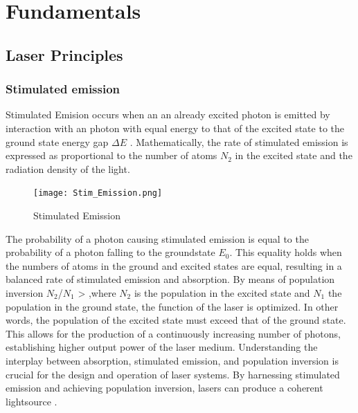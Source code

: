 \section{Fundamentals}
\label{sec:fundamentals}

\subsection{Laser Principles}
    
    \subsubsection{Stimulated emission}
    Stimulated Emision occurs when an an already excited photon is emitted by interaction with an photon with equal energy to that of the excited state to the ground state energy gap $\Delta E$ .
    Mathematically, the rate of stimulated emission is expressed as proportional to the number of atoms $N_2$ in the excited state and the radiation density of the light. 
   
    
    \begin{figure}
        \centering
        \texttt{[image: Stim\_Emission.png]}
        
        \caption[width = 0.1\textwidth]{ Stimulated Emission  \cite{Laser_cav} }
        \label{fig:energy_diagram}
    \end{figure}
    \noindent The probability of a photon causing stimulated emission is equal to the probability of a photon falling to the groundstate $E_0$.
    This equality holds when the numbers of atoms in the ground and excited states are equal, resulting in a balanced rate of stimulated emission and absorption.  
    By means of population  inversion $N_2$/$N_1$ > ,where $N_2$ is the population in the excited state and $N_1$ the population in the ground state, the function of the laser is optimized. 
    In other words, the population of the excited state must exceed that of the ground state. 
    This allows for the production of a continuously increasing number of photons, establishing higher output power of the laser medium.
    Understanding the interplay between absorption, stimulated emission, and population inversion is crucial for the design and operation of laser systems. 
    By harnessing stimulated emission and achieving population inversion, lasers can produce a coherent lightsource . \cite{Laser_cav}

